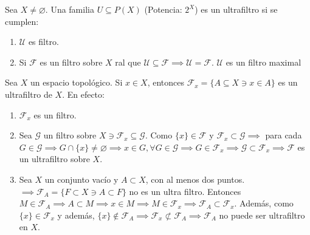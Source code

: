 \begin{definicion}
    Sea $X\neq \varnothing$. Una familia $U\subseteq P(X)$ (Potencia: $2^X$) es un ultrafiltro si se cumplen: 
    \begin{enumerate}
        \item $\mathcal{U}$ es filtro. 
        \item Si $\mathcal{F}$ es un filtro sobre $X$ ral que $\mathcal{U}\subseteq \mathcal{F}\implies \mathcal{U}= \mathcal{F}$.  $\mathcal{U}$ es un filtro maximal
    \end{enumerate} 
\end{definicion}
\begin{ejemplo}
    Sea $X$ un espacio topológico. Si $x\in X$, entonces $\mathcal{F}_x = \{A\subseteq X\ni x\in A\}$ es un ultrafiltro de $X$. En efecto: 
    \begin{enumerate}
        \item $\mathcal{F}_x$ es un filtro. 
        \item Sea $\mathcal{G}$ un filtro sobre $X\ni \mathcal{F}_x\subseteq \mathcal{G}$. Como $\{x\}\in \mathcal{F}$ y $\mathcal{F}_x\subset \mathcal{G}\implies $ para cada $G\in \mathcal{G}\implies G\cap\{x\}\neq \varnothing\implies x\in G,\forall G\in \mathcal{G}\implies G\in \mathcal{F}_x\implies \mathcal{G}\subset \mathcal{F}_x\implies \mathcal{F}$ es un ultrafiltro sobre $X$.
        \item  Sea $X$ un conjunto vacío y $A\subset X$, con al menos dos puntos. $\implies \mathcal{F}_A=\{F\subset X\ni A\subset F\}$ no es un ultra filtro. Entonces $M\in \mathcal{F}_A\implies A\subset M\implies x\in M \implies M\in \mathcal{F}_x\implies \mathcal{F}_A\subset \mathcal{F}_x$. Además, como $\{x\}\in \mathcal{F}_x$ y además, $\{x\}\not\in \mathcal{F}_A\implies \mathcal{F}_x\not\subset \mathcal{F}_A\implies \mathcal{F}_A$ no puede ser ultrafiltro en $X$. 
    \end{enumerate}
\end{ejemplo}

